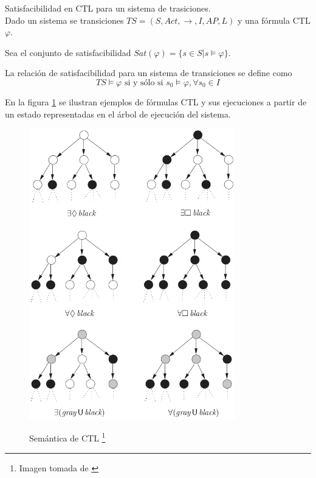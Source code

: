 \begin{definicion}
Satisfacibilidad en CTL para un sistema de trasiciones.\\
Dado un sistema se transiciones $TS = (S, Act, \rightarrow, I, AP, L)$ y una fórmula CTL $\varphi$. 

Sea el conjunto de satisfacibilidad $Sat(\varphi) = \{ s \in S | s \models \varphi \}$.

La relación de satisfacibilidad para un sistema de transiciones se define como 
\[ TS \models \varphi \text{ si y sólo si } s_0 \models \varphi, \forall s_0 \in I \]
\end{definicion}

En la figura \ref{fig:semantica_CTL} se ilustran ejemplos de fórmulas CTL y sus
 ejecuciones a partir de un estado representadas en el árbol de ejecución del sistema.


\begin{figure}[hbtp]
\begin{minipage}{\textwidth}
\begin{center}
\caption[Semántica de CTL]%
{Semántica de CTL \footnote[1]{Imagen tomada de \cite{katoen}}}
\includegraphics[width=0.8\textwidth]{ctl/imagenes/semanticaCTL.png}
\label{fig:semantica_CTL}
\end{center}
\end{minipage}
\end{figure}


